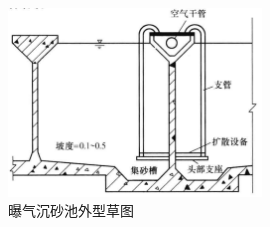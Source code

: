 \begin{figure}[H]
	\centering
	\includegraphics[width=0.6\textwidth]{figures/Sketch of the appearance of the aeration grit tank.png}
	\caption{曝气沉砂池外型草图}
	\label{fig:Sketch of the appearance of the aeration grit tank}
\end{figure}

